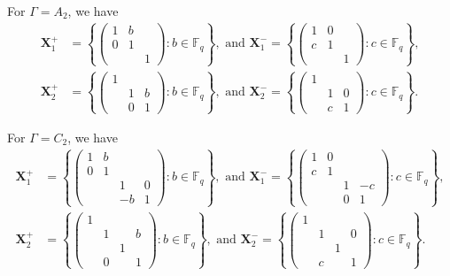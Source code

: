\documentclass[12pt]{amsart}
\theoremstyle{definition}
\newcommand{\FF}{{\mathbb F}}
\newcommand{\amgrpX}{{\mathbf{X}}}
\newcommand{\liediag}{\Gamma}
\begin{document}
For $\liediag=A_2$, we have
 \begin{align*}
\amgrpX_1^+&=\left\{\begin{pmatrix} 
1 & b  &  \\
 0 & 1  &  \\
 &  & 1  \end{pmatrix}\colon b\in\FF_{q} \right\},
  \mbox{ and  }
\amgrpX_1^-=\left\{\begin{pmatrix} 
1 &  0 & \\
 c & 1   & \\
 &  & 1  \end{pmatrix}\colon c\in\FF_{q} \right\}, 
  \\
\amgrpX_2^+&=\left\{\begin{pmatrix} 
1 &   &  \\
  & 1  &  b\\
 &  0 & 1  \end{pmatrix}\colon b\in\FF_{q} \right\},
  \mbox{ and  }
\amgrpX_2^-=\left\{\begin{pmatrix} 
1 &   & \\
  & 1   & 0\\
 &  c & 1  \end{pmatrix}\colon c\in\FF_{q} \right\}.
  \end{align*}

For $\liediag=C_2$, we have
 \begin{align*}
\amgrpX_1^+&=\left\{\begin{pmatrix} 
1 & b & & \\
0 & 1  & & \\
 &  & 1 & 0 \\
 &  &  -b & 1 \end{pmatrix}\colon b \in\FF_{q} \right\},
\mbox{ and }
\amgrpX_1^-=\left\{\begin{pmatrix} 
1 & 0 & & \\
c & 1  & & \\
 &  & 1 & -c \\
 &  &  0 & 1 \end{pmatrix}\colon c \in\FF_{q} \right\},\\
\amgrpX_2^+&=\left\{\begin{pmatrix} 
1 &  & & \\
 & 1  & & b\\
 &  & 1& \\
 & 0 & &1 \end{pmatrix}\colon b\in\FF_{q} \right\},
  \mbox{ and  }
\amgrpX_2^-=\left\{\begin{pmatrix} 
1 &  & & \\
 & 1  & & 0\\
 &  & 1& \\
 & c & &1 \end{pmatrix}\colon c\in\FF_{q} \right\}.
  \end{align*}
\end{document}
